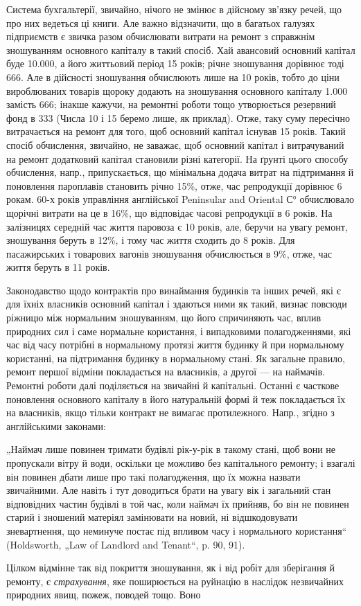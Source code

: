 \roztyagnut
Система бухгальтерії, звичайно, нічого не змінює в дійсному зв’язку речей, що про них ведеться ці
книги. Але важно відзначити, що в багатьох
галузях підприємств є звичка разом обчислювати витрати на ремонт з справжнім зношуванням
основного капіталу в такий спосіб. Хай авансовий основний капітал буде \num{10.000}, а його
життьовий період 15 років; річне зношування дорівнює тоді 666. Але в дійсності
зношування обчислюють лише на 10 років, тобто до ціни вироблюваних товарів щороку додають на
зношування основного капіталу \num{1.000} замість 666; інакше кажучи, на ремонтні
роботи тощо утворюється резервний фонд в 333 (Числа 10 і 15 беремо лише, як приклад).
Отже, таку суму пересічно витрачається на ремонт для того, щоб основний капітал існував 15 років.
Такий спосіб обчислення, звичайно, не заважає, щоб основний капітал і витрачуваний на ремонт
додатковий капітал становили різні категорії. На ґрунті цього способу обчислення, напр.,
припускається, що мінімальна додача витрат на підтримання й поновлення пароплавів становить річно
15\%, отже, час репродукції дорівнює 6 рокам. 60-х років управління англійської Peninsular and
Oriental С° обчислювало щорічні витрати на це в 16\%, що відповідає часові репродукції в 6 років.
На залізницях середній час життя паровоза є 10 років, але, беручи на увагу ремонт, зношування беруть
в 12\%, і тому час життя сходить до 8 років. Для пасажирських і товарових вагонів зношування
обчислюється в 9\%, отже, час життя беруть в 11 років.

Законодавство щодо контрактів про винаймання будинків та інших речей, які є для їхніх власників
основний капітал і здаються ними як такий, визнає повсюди ріжницю між нормальним зношуванням, що
його спричиняють час, вплив природних сил і саме нормальне користання, і випадковими полагодженнями,
які час від часу потрібні в нормальному протязі життя будинку й при нормальному користанні, на
підтримання будинку в нормальному стані. Як загальне правило, ремонт першої відміни покладається на
власників, а другої — на наймачів. Ремонтні роботи далі поділяється на звичайні й капітальні.
Останні є часткове поновлення основного капіталу в його натуральній формі й теж покладається їх на
власників, якщо тільки контракт не вимагає протилежного. Напр., згідно з англійськими законами:

„Наймач лише повинен тримати будівлі рік-у-рік в такому стані, щоб вони не пропускали вітру й води,
оскільки це можливо без капітального ремонту; і взагалі він повинен дбати лише про такі
полагодження, що їх можна назвати звичайними. Але навіть і тут доводиться брати на увагу вік і
загальний стан відповідних частин будівлі в той час, коли наймач їх прийняв, бо він не повинен
старий і зношений матеріял замінювати на новий, ні відшкодовувати зневартнення, що неминуче постає
під впливом часу і нормального користання“ (Holdsworth, „Law of Landlord and Tenant“, p. 90, 91).

Цілком відмінне так від покриття зношування, як і від робіт для зберігання й ремонту, є \emph{страхування},
яке поширюється на руйнацію в наслідок незвичайних природних явищ, пожеж, поводей тощо. Воно
\parbreak{}  %
